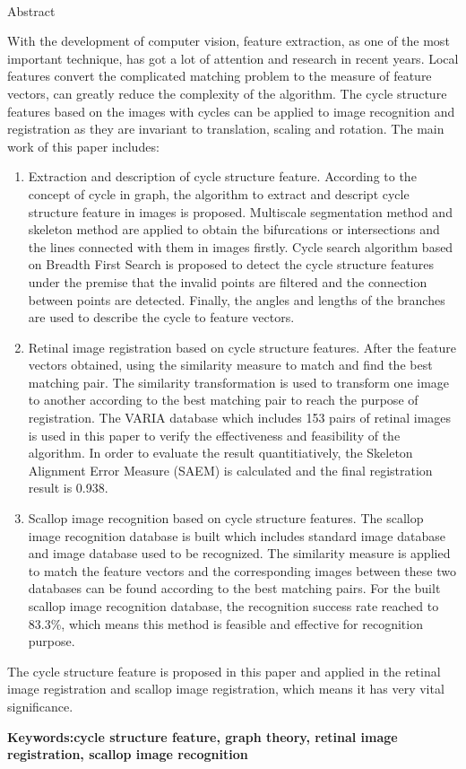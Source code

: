 \newpage
\mbox{}
\newpage
\begin{center}
  {\sanhao[1.5]\heiti\oucetitle\\\vskip7pt Abstract}
\end{center}
{\normalsize\songti
With the development of computer vision, feature extraction, as one of the most important technique, has got a lot of attention and research in recent years. Local features convert the complicated matching problem to the measure of feature vectors, can greatly reduce the complexity of the algorithm. The cycle structure features based on the images with cycles can be applied to image recognition and registration as they are invariant to translation, scaling and rotation. The main work of this paper includes:

\begin{enumerate}
\item Extraction and description of cycle structure feature. According to the concept of cycle in graph, the algorithm to extract and descript cycle structure feature in images is proposed. Multiscale segmentation method and skeleton method are applied to obtain the bifurcations or intersections and the lines connected with them in images firstly. Cycle search algorithm based on Breadth First Search is proposed to detect the cycle structure features under the premise that the invalid points are filtered and the connection between points are detected. Finally, the angles and lengths of the branches are used to describe the cycle to feature vectors. 
\item Retinal image registration based on cycle structure features. After the feature vectors obtained, using the similarity measure to match and find the best matching pair. The similarity transformation is used to transform one image to another according to the best matching pair to reach the purpose of registration. The VARIA database which includes 153 pairs of retinal images is used in this paper to verify the effectiveness and feasibility of the algorithm.
In order to evaluate the result quantitiatively, the Skeleton Alignment Error Measure (SAEM) is calculated and the final registration result is 0.938.
\item Scallop image recognition based on cycle structure features. The scallop image recognition database is built which includes standard image database and image database used to be recognized. The similarity measure is applied to match the feature vectors and the corresponding images between these two databases can be found according to the best matching pairs. For the built scallop image recognition database, the recognition success rate reached to 83.3\%, which means this method is feasible and effective for recognition purpose.
\end{enumerate}  	
The cycle structure feature is proposed in this paper and applied in the retinal image registration and scallop image registration, which means it has very vital significance.
   
}
\vskip12bp
{\xiaosi\heiti\noindent 
\textbf{Keywords:\enskip cycle structure feature, graph theory, retinal image registration, scallop image recognition}}
